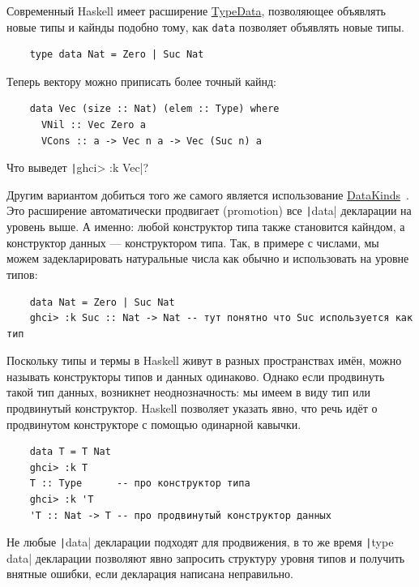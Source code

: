 Современный Haskell имеет расширение \href{https://downloads.haskell.org/ghc/latest/docs/users_guide/exts/type_data.html#extension-TypeData}{TypeData}, позволяющее объявлять новые типы и кайнды подобно тому, как \texttt{data} позволяет объявлять новые типы.
\begin{verbatim}
    type data Nat = Zero | Suc Nat
\end{verbatim}

Теперь вектору можно приписать более точный кайнд:
\begin{verbatim}
    data Vec (size :: Nat) (elem :: Type) where
      VNil :: Vec Zero a
      VCons :: a -> Vec n a -> Vec (Suc n) a
\end{verbatim}

\begin{task}
    Что выведет \texttt|ghci> :k Vec|?
\end{task}

Другим вариантом добиться того же самого является использование \href{https://downloads.haskell.org/ghc/latest/docs/users_guide/exts/data_kinds.html#extension-DataKinds}{DataKinds}~\cite{yorgey2012giving}.
Это расширение автоматически продвигает (promotion) все \texttt|data| декларации на уровень выше.
А именно: любой конструктор типа также становится кайндом, а конструктор данных --- конструктором типа.
Так, в примере с числами, мы можем задекларировать натуральные числа как обычно и использовать на уровне типов:
\begin{verbatim}
    data Nat = Zero | Suc Nat
    ghci> :k Suc :: Nat -> Nat -- тут понятно что Suc используется как тип
\end{verbatim}

Поскольку типы и термы в Haskell живут в разных пространствах имён, можно называть конструкторы типов и данных одинаково.
Однако если продвинуть такой тип данных, возникнет неоднозначность: мы имеем в виду тип или продвинутый конструктор.
Haskell позволяет указать явно, что речь идёт о продвинутом конструкторе с помощью одинарной кавычки.
\begin{verbatim}
    data T = T Nat
    ghci> :k T
    T :: Type      -- про конструктор типа
    ghci> :k 'T
    'T :: Nat -> T -- про продвинутый конструктор данных
\end{verbatim}

Не любые \texttt|data| декларации подходят для продвижения, в то же время \texttt|type data| декларации позволяют явно запросить структуру уровня типов и получить внятные ошибки, если декларация написана неправильно.


